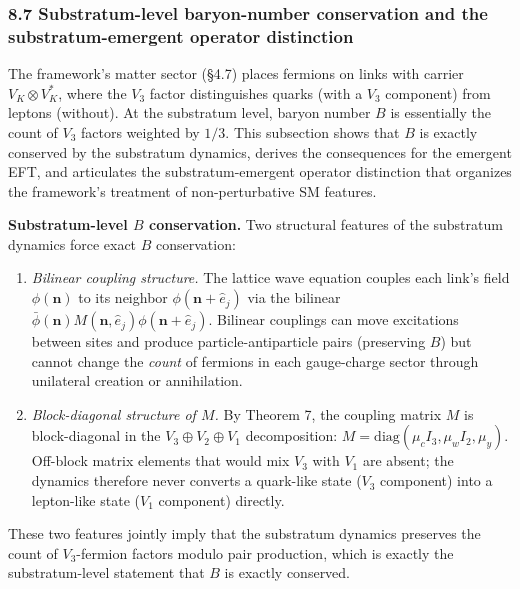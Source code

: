 \documentclass[
]{article}
\begin{document}
\hypertarget{substratum-level-baryon-number-conservation-and-the-substratum-emergent-operator-distinction}{%
\subsubsection{8.7 Substratum-level baryon-number conservation and the
substratum-emergent operator
distinction}\label{substratum-level-baryon-number-conservation-and-the-substratum-emergent-operator-distinction}}

The framework's matter sector (§4.7) places fermions on links with
carrier \(V_K \otimes V_K^*\), where the \(V_3\) factor distinguishes
quarks (with a \(V_3\) component) from leptons (without). At the
substratum level, baryon number \(B\) is essentially the count of
\(V_3\) factors weighted by \(1/3\). This subsection shows that \(B\) is
exactly conserved by the substratum dynamics, derives the consequences
for the emergent EFT, and articulates the substratum-emergent operator
distinction that organizes the framework's treatment of non-perturbative
SM features.

\textbf{Substratum-level \(B\) conservation.} Two structural features of
the substratum dynamics force exact \(B\) conservation:

\begin{enumerate}
\def\labelenumi{(\roman{enumi})}
\item
  \emph{Bilinear coupling structure.} The lattice wave equation couples
  each link's field \(\phi(\mathbf{n})\) to its neighbor
  \(\phi(\mathbf{n} + \hat{e}_j)\) via the bilinear
  \(\bar{\phi}(\mathbf{n}) M(\mathbf{n}, \hat{e}_j) \phi(\mathbf{n} + \hat{e}_j)\).
  Bilinear couplings can move excitations between sites and produce
  particle-antiparticle pairs (preserving \(B\)) but cannot change the
  \emph{count} of fermions in each gauge-charge sector through
  unilateral creation or annihilation.
\item
  \emph{Block-diagonal structure of \(M\).} By Theorem 7, the coupling
  matrix \(M\) is block-diagonal in the \(V_3 \oplus V_2 \oplus V_1\)
  decomposition: \(M = \mathrm{diag}(\mu_c I_3, \mu_w I_2, \mu_y)\).
  Off-block matrix elements that would mix \(V_3\) with \(V_1\) are
  absent; the dynamics therefore never converts a quark-like state
  (\(V_3\) component) into a lepton-like state (\(V_1\) component)
  directly.
\end{enumerate}

These two features jointly imply that the substratum dynamics preserves
the count of \(V_3\)-fermion factors modulo pair production, which is
exactly the substratum-level statement that \(B\) is exactly conserved.
\end{document}
